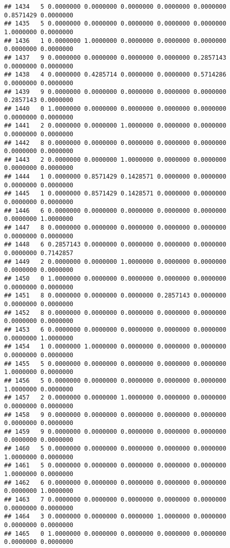 \documentclass[
]{article}
\begin{document}
\begin{verbatim}
## 1434   5 0.0000000 0.0000000 0.0000000 0.0000000 0.0000000 0.8571429 0.0000000
## 1435   5 0.0000000 0.0000000 0.0000000 0.0000000 0.0000000 1.0000000 0.0000000
## 1436   1 0.0000000 1.0000000 0.0000000 0.0000000 0.0000000 0.0000000 0.0000000
## 1437   9 0.0000000 0.0000000 0.0000000 0.0000000 0.2857143 0.0000000 0.0000000
## 1438   4 0.0000000 0.4285714 0.0000000 0.0000000 0.5714286 0.0000000 0.0000000
## 1439   9 0.0000000 0.0000000 0.0000000 0.0000000 0.0000000 0.2857143 0.0000000
## 1440   0 1.0000000 0.0000000 0.0000000 0.0000000 0.0000000 0.0000000 0.0000000
## 1441   2 0.0000000 0.0000000 1.0000000 0.0000000 0.0000000 0.0000000 0.0000000
## 1442   8 0.0000000 0.0000000 0.0000000 0.0000000 0.0000000 0.0000000 0.0000000
## 1443   2 0.0000000 0.0000000 1.0000000 0.0000000 0.0000000 0.0000000 0.0000000
## 1444   1 0.0000000 0.8571429 0.1428571 0.0000000 0.0000000 0.0000000 0.0000000
## 1445   1 0.0000000 0.8571429 0.1428571 0.0000000 0.0000000 0.0000000 0.0000000
## 1446   6 0.0000000 0.0000000 0.0000000 0.0000000 0.0000000 0.0000000 1.0000000
## 1447   8 0.0000000 0.0000000 0.0000000 0.0000000 0.0000000 0.0000000 0.0000000
## 1448   6 0.2857143 0.0000000 0.0000000 0.0000000 0.0000000 0.0000000 0.7142857
## 1449   2 0.0000000 0.0000000 1.0000000 0.0000000 0.0000000 0.0000000 0.0000000
## 1450   0 1.0000000 0.0000000 0.0000000 0.0000000 0.0000000 0.0000000 0.0000000
## 1451   8 0.0000000 0.0000000 0.0000000 0.2857143 0.0000000 0.0000000 0.0000000
## 1452   8 0.0000000 0.0000000 0.0000000 0.0000000 0.0000000 0.0000000 0.0000000
## 1453   6 0.0000000 0.0000000 0.0000000 0.0000000 0.0000000 0.0000000 1.0000000
## 1454   1 0.0000000 1.0000000 0.0000000 0.0000000 0.0000000 0.0000000 0.0000000
## 1455   5 0.0000000 0.0000000 0.0000000 0.0000000 0.0000000 1.0000000 0.0000000
## 1456   5 0.0000000 0.0000000 0.0000000 0.0000000 0.0000000 1.0000000 0.0000000
## 1457   2 0.0000000 0.0000000 1.0000000 0.0000000 0.0000000 0.0000000 0.0000000
## 1458   9 0.0000000 0.0000000 0.0000000 0.0000000 0.0000000 0.0000000 0.0000000
## 1459   9 0.0000000 0.0000000 0.0000000 0.0000000 0.0000000 0.0000000 0.0000000
## 1460   5 0.0000000 0.0000000 0.0000000 0.0000000 0.0000000 1.0000000 0.0000000
## 1461   5 0.0000000 0.0000000 0.0000000 0.0000000 0.0000000 1.0000000 0.0000000
## 1462   6 0.0000000 0.0000000 0.0000000 0.0000000 0.0000000 0.0000000 1.0000000
## 1463   7 0.0000000 0.0000000 0.0000000 0.0000000 0.0000000 0.0000000 0.0000000
## 1464   3 0.0000000 0.0000000 0.0000000 1.0000000 0.0000000 0.0000000 0.0000000
## 1465   0 1.0000000 0.0000000 0.0000000 0.0000000 0.0000000 0.0000000 0.0000000

\end{verbatim}
\end{document}
